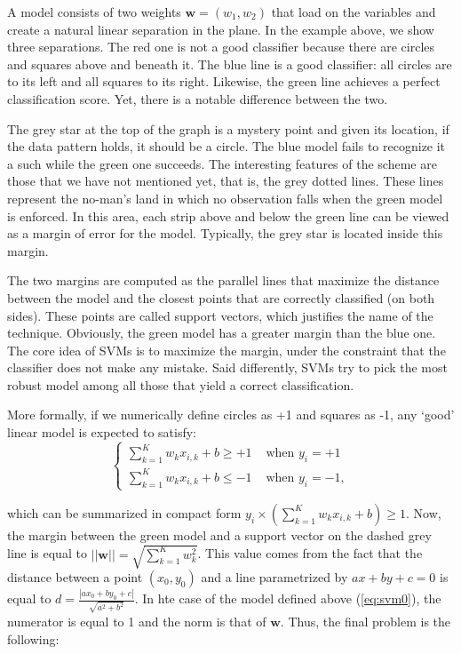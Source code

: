 \documentclass[]{krantz}
\theoremstyle{definition}
\theoremstyle{definition}
\theoremstyle{definition}
\theoremstyle{remark}
\begin{document}
A model consists of two weights \(\textbf{w}=(w_1,w_2)\) that load on
the variables and create a natural linear separation in the plane. In
the example above, we show three separations. The red one is not a good
classifier because there are circles and squares above and beneath it.
The blue line is a good classifier: all circles are to its left and all
squares to its right. Likewise, the green line achieves a perfect
classification score. Yet, there is a notable difference between the
two.

The grey star at the top of the graph is a mystery point and given its
location, if the data pattern holds, it should be a circle. The blue
model fails to recognize it a such while the green one succeeds. The
interesting features of the scheme are those that we have not mentioned
yet, that is, the grey dotted lines. These lines represent the no-man's
land in which no observation falls when the green model is enforced. In
this area, each strip above and below the green line can be viewed as a
margin of error for the model. Typically, the grey star is located
inside this margin.

The two margins are computed as the parallel lines that maximize the
distance between the model and the closest points that are correctly
classified (on both sides). These points are called support vectors,
which justifies the name of the technique. Obviously, the green model
has a greater margin than the blue one. The core idea of SVMs is to
maximize the margin, under the constraint that the classifier does not
make any mistake. Said differently, SVMs try to pick the most robust
model among all those that yield a correct classification.

More formally, if we numerically define circles as +1 and squares as -1,
any `good' linear model is expected to satisfy: \begin{equation}
\label{eq:svm0}
\left\{\begin{array}{lll}
\sum_{k=1}^Kw_kx_{i,k}+b \ge +1 & \text{ when } y_i=+1 \\
\sum_{k=1}^Kw_kx_{i,k}+b \le -1 & \text{ when } y_i=-1,
\end{array}\right.
\end{equation}

which can be summarized in compact form
\(y_i \times \left(\sum_{k=1}^K w_kx_{i,k}+b \right)\ge 1\). Now, the
margin between the green model and a support vector on the dashed grey
line is equal to \(||\textbf{w}||=\sqrt{\sum_{k=1}^Kw_k^2}\). This value
comes from the fact that the distance between a point \((x_0,y_0)\) and
a line parametrized by \(ax+by+c=0\) is equal to
\(d=\frac{|ax_0+by_0+c|}{\sqrt{a^2+b^2}}\). In hte case of the model
defined above (\eqref{eq:svm0}), the numerator is equal to 1 and the norm
is that of \(\textbf{w}\). Thus, the final problem is the following:
\end{document}
